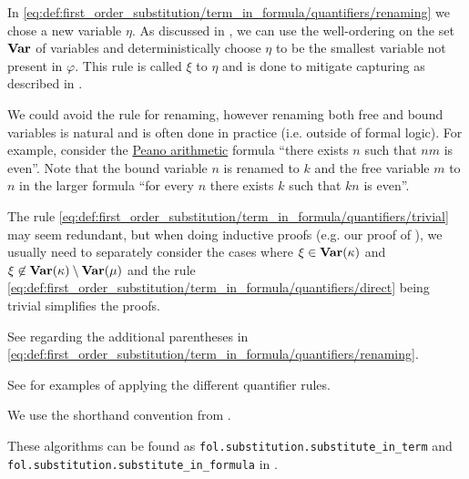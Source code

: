 \begin{comments}
  \item In \eqref{eq:def:first_order_substitution/term_in_formula/quantifiers/renaming} we chose a new variable \( \eta \). As discussed in , we can use the well-ordering on the set \( \operatorname{\mathbf{Var}} \) of variables and deterministically choose \( \eta \) to be the smallest variable not present in \( \varphi \). This rule is called  \( \xi \) to \( \eta \) and is done to mitigate capturing as described in .

  \item We could avoid the rule for renaming, however renaming both free and bound variables is natural and is often done in practice (i.e. outside of formal logic). For example, consider the \hyperref[def:peano_arithmetic]{Peano arithmetic} formula \enquote{there exists \( n \) such that \( nm \) is even}. Note that the bound variable \( n \) is renamed to \( k \) and the free variable \( m \) to \( n \) in the larger formula \enquote{for every \( n \) there exists \( k \) such that \( kn \) is even}.

  \item The rule \eqref{eq:def:first_order_substitution/term_in_formula/quantifiers/trivial} may seem redundant, but when doing inductive proofs (e.g. our proof of ), we usually need to separately consider the cases where \( \xi \in \operatorname{\mathbf{Var}}(\kappa) \) and \( \xi \not\in \operatorname{\mathbf{Var}}(\kappa) \setminus \operatorname{\mathbf{Var}}(\mu) \) and the rule \eqref{eq:def:first_order_substitution/term_in_formula/quantifiers/direct} being trivial simplifies the proofs.

  \item See  regarding the additional parentheses in \eqref{eq:def:first_order_substitution/term_in_formula/quantifiers/renaming}.

  \item See  for examples of applying the different quantifier rules.

  \item We use the shorthand convention from .

  \item These algorithms can be found as \texttt{fol.substitution.substitute\_in\_term} and \texttt{fol.substitution.substitute\_in\_formula} in \cite{code}.
\end{comments}

